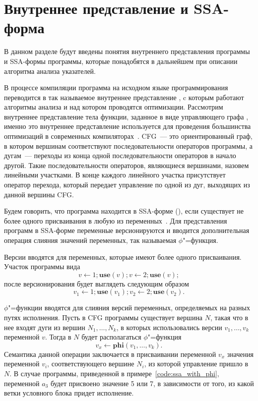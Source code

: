 \documentclass[14pt,titlepage,draft]{extarticle}
\let\mathphi\phi
\renewcommand{\phi}{\ensuremath{\mathphi}}
\newcommand{\op}[1]{\mathbf{#1}}
\begin{document}
  \section{Внутреннее представление и SSA-форма}


    В данном разделе будут введены понятия внутреннего представления программы
    и SSA-формы программы, которые понадобятся в дальнейшем при описании
    алгоритма анализа указателей.

    В процессе компиляции программа на исходном языке программирования
    переводится в так называемое внутреннее представление
    , c которым работают
    алгоритмы анализа и над котором проводятся оптимизации.
    Рассмотрим внутреннее представление тела функции, заданное в виде
    управляющего графа , именно это
    внутреннее представление используется для проведения большинства
    оптимизаций в современных компиляторах~\cite{muchnick}.
    CFG~--- это ориентированный граф, в котором вершинам соответствуют
    последовательности операторов программы, а дугам~--- переходы из конца
    одной последовательности операторов в начало другой. Такие
    последовательности операторов, являющиеся вершинами, назовем линейными
    участками. В конце каждого линейного участка присутствует оператор
    перехода, который передает управление по одной из дуг, выходящих из
    данной вершины CFG.

    Будем говорить, что программа находится в SSA-форме (), если существует не более одного присваивания в любую из
    переменных~\cite{ssa}.
    Для представления программ в SSA-форме переменные версионируются и
    вводится дополнительная операция слияния значений переменных, так
    называемая \phi"=функция.

    Версии вводятся для переменных, которые имеют более одного присваивания.
    Участок программы вида
    \[ v \gets 1; \op{use}(v); v \gets 2; \op{use}(v); \]
    после версионирования будет выглядеть следующим образом
    \[ v_1 \gets 1; \op{use}(v_1); v_2 \gets 2; \op{use}(v_2). \]

    \phi"=функции вводятся для слияния версий переменных, определяемых
    на разных путях исполнения. Пусть в CFG программы существует
    вершина $N$, такая что в нее входят дуги из вершин $N_1, \ldots, N_k$, в
    которых использовались версии $v_1, \ldots, v_k$ переменной $v$. Тогда в
    $N$ будет располагаться \phi"=функция
    \[ v_x \gets \op{phi}(v_1, \ldots, v_k). \]
    Семантика данной операции заключается в присваивании переменной $v_x$
    значения переменной $v_i$, соответствующего вершине $N_i$, из которой
    управление пришло в $N$. В случае программы, приведенной в
    примере~\ref{code:ssa_with_phi}, переменной $a_3$ будет присвоено значение
    5 или 7, в зависимости от того, из какой ветки условного блока придет
    исполнение.
\end{document}
